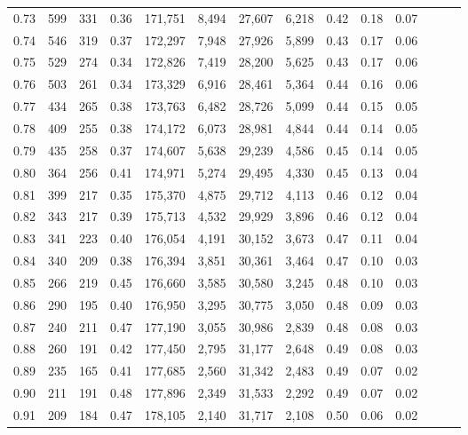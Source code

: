 \begin{tabular}{rrrrrrrrrrrrrr}
0.73 &    599 &  331 &  0.36 &  171,751 &    8,494 &  27,607 &   6,218 &  0.42 &  0.18 &      0.07 \\
0.74 &    546 &  319 &  0.37 &  172,297 &    7,948 &  27,926 &   5,899 &  0.43 &  0.17 &      0.06 \\
0.75 &    529 &  274 &  0.34 &  172,826 &    7,419 &  28,200 &   5,625 &  0.43 &  0.17 &      0.06 \\
0.76 &    503 &  261 &  0.34 &  173,329 &    6,916 &  28,461 &   5,364 &  0.44 &  0.16 &      0.06 \\
0.77 &    434 &  265 &  0.38 &  173,763 &    6,482 &  28,726 &   5,099 &  0.44 &  0.15 &      0.05 \\
0.78 &    409 &  255 &  0.38 &  174,172 &    6,073 &  28,981 &   4,844 &  0.44 &  0.14 &      0.05 \\
0.79 &    435 &  258 &  0.37 &  174,607 &    5,638 &  29,239 &   4,586 &  0.45 &  0.14 &      0.05 \\
0.80 &    364 &  256 &  0.41 &  174,971 &    5,274 &  29,495 &   4,330 &  0.45 &  0.13 &      0.04 \\
0.81 &    399 &  217 &  0.35 &  175,370 &    4,875 &  29,712 &   4,113 &  0.46 &  0.12 &      0.04 \\
0.82 &    343 &  217 &  0.39 &  175,713 &    4,532 &  29,929 &   3,896 &  0.46 &  0.12 &      0.04 \\
0.83 &    341 &  223 &  0.40 &  176,054 &    4,191 &  30,152 &   3,673 &  0.47 &  0.11 &      0.04 \\
0.84 &    340 &  209 &  0.38 &  176,394 &    3,851 &  30,361 &   3,464 &  0.47 &  0.10 &      0.03 \\
0.85 &    266 &  219 &  0.45 &  176,660 &    3,585 &  30,580 &   3,245 &  0.48 &  0.10 &      0.03 \\
0.86 &    290 &  195 &  0.40 &  176,950 &    3,295 &  30,775 &   3,050 &  0.48 &  0.09 &      0.03 \\
0.87 &    240 &  211 &  0.47 &  177,190 &    3,055 &  30,986 &   2,839 &  0.48 &  0.08 &      0.03 \\
0.88 &    260 &  191 &  0.42 &  177,450 &    2,795 &  31,177 &   2,648 &  0.49 &  0.08 &      0.03 \\
0.89 &    235 &  165 &  0.41 &  177,685 &    2,560 &  31,342 &   2,483 &  0.49 &  0.07 &      0.02 \\
0.90 &    211 &  191 &  0.48 &  177,896 &    2,349 &  31,533 &   2,292 &  0.49 &  0.07 &      0.02 \\
0.91 &    209 &  184 &  0.47 &  178,105 &    2,140 &  31,717 &   2,108 &  0.50 &  0.06 &      0.02 \\

\end{tabular}
